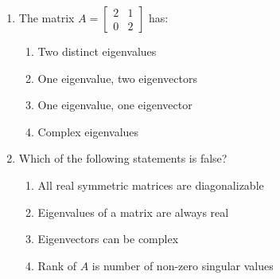 \begin{enumerate}
\item The matrix \( A = \begin{bmatrix} 2 & 1 \\ 0 & 2 \end{bmatrix} \) has:

\begin{enumerate}[label=(\alph*)]
\item Two distinct eigenvalues 
\item One eigenvalue, two eigenvectors 
\item One eigenvalue, one eigenvector 
\item Complex eigenvalues
\end{enumerate}

\item Which of the following statements is false?

\begin{enumerate}[label=(\alph*)]
\item All real symmetric matrices are diagonalizable 
\item Eigenvalues of a matrix are always real 
\item Eigenvectors can be complex 
\item Rank of \( A \) is number of non-zero singular values
\end{enumerate}

\end{enumerate}

